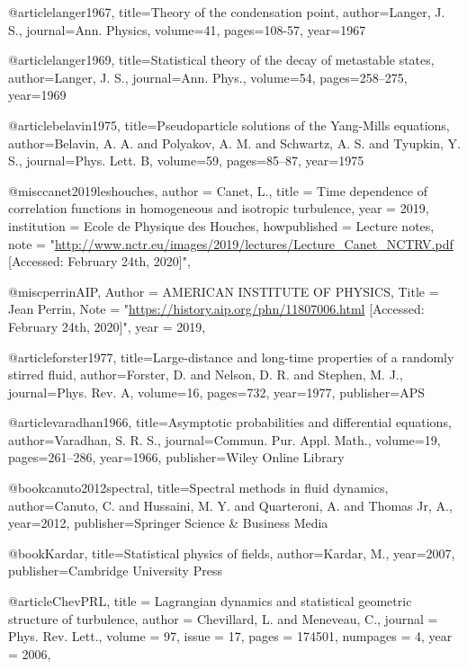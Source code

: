 @article{langer1967,
  title={Theory of the condensation point},
  author={Langer, J. S.},
  journal={Ann. Physics},
  volume={41},
  pages={108-57},
  year={1967}
}

@article{langer1969,
  title={Statistical theory of the decay of metastable states},
  author={Langer, J. S.},
  journal={Ann. Phys.},
  volume={54},
  pages={258--275},
  year={1969}
}


@article{belavin1975,
  title={{Pseudoparticle solutions of the Yang-Mills equations}},
  author={Belavin, A. A. and Polyakov, A. M. and Schwartz, A. S. and Tyupkin, Y. S.},
  journal={Phys. Lett. B},
  volume={59},
  pages={85--87},
  year={1975}
}

@misc{canet2019leshouches,
  author        = {Canet, L.},
  title         = {Time dependence of correlation functions in homogeneous and isotropic turbulence},
  year          = {2019},
  institution = {Ecole de Physique des Houches},
  howpublished = {Lecture notes},
  note   = "\url{http://www.nctr.eu/images/2019/lectures/Lecture_Canet_NCTRV.pdf} [Accessed: February 24th, 2020]",
}

@misc{perrinAIP,
    Author = {{AMERICAN INSTITUTE OF PHYSICS}},
    Title  = {{Jean Perrin}},
    Note   = "\url{https://history.aip.org/phn/11807006.html} [Accessed: February 24th, 2020]",
    year = {2019},
  }

@article{forster1977,
  title={Large-distance and long-time properties of a randomly stirred fluid},
  author={Forster, D. and Nelson, D. R. and Stephen, M. J.},
  journal={Phys. Rev. A},
  volume={16},
  pages={732},
  year={1977},
  publisher={APS}
}


@article{varadhan1966,
  title={Asymptotic probabilities and differential equations},
  author={Varadhan, S. R. S.},
  journal={Commun. Pur. Appl. Math.},
  volume={19},
  pages={261--286},
  year={1966},
  publisher={Wiley Online Library}
}

@book{canuto2012spectral,
  title={Spectral methods in fluid dynamics},
  author={Canuto, C. and Hussaini, M. Y. and Quarteroni, A. and Thomas Jr, A.},
  year={2012},
  publisher={Springer Science \& Business Media}
}

@book{Kardar,
  title={Statistical physics of fields},
  author={Kardar, M.},
  year={2007},
  publisher={Cambridge University Press}
}

@article{ChevPRL,
  title = {Lagrangian dynamics and statistical geometric structure of turbulence},
  author = {Chevillard, L. and Meneveau, C.},
  journal = {Phys. Rev. Lett.},
  volume = {97},
  issue = {17},
  pages = {174501},
  numpages = {4},
  year = {2006},
}

